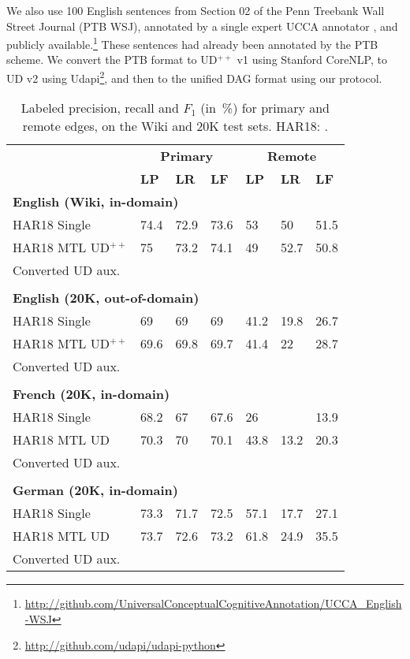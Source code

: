 \documentclass[11pt,a4paper]{article}
\begin{document}
We also use 100 English sentences from Section 02 of the Penn Treebank Wall Street Journal
(PTB WSJ),
annotated by a single expert UCCA annotator \cite{hershcovich2018multitask},
and publicly available.\footnote{\url{http://github.com/UniversalConceptualCognitiveAnnotation/UCCA_English-WSJ}}
These sentences had already been annotated by the PTB scheme.
We convert the PTB format to UD$^{++}$ v1 using Stanford CoreNLP,
to UD v2 using Udapi\footnote{\url{http://github.com/udapi/udapi-python}},
and then to the unified DAG format using our protocol.


\begin{table}[t]
\centering
\small
\setlength\tabcolsep{3pt}
\begin{tabular}{l|lll|lll}
& \multicolumn{3}{c|}{\footnotesize \bf Primary} & \multicolumn{3}{c}{\footnotesize \bf Remote} \\
& \footnotesize \textbf{LP} & \footnotesize \textbf{LR} & \footnotesize \textbf{LF}
& \footnotesize \textbf{LP} & \footnotesize \textbf{LR} & \footnotesize \textbf{LF} \\
\hline
\multicolumn{4}{l|}{\small \bf English (Wiki, in-domain)} & \\
\footnotesize HAR18 Single
& 74.4 & 72.9 & 73.6 & 53 & 50 & 51.5 \\
\footnotesize HAR18 MTL UD$^{++}$
& 75 & 73.2 & 74.1 & 49 & 52.7 & 50.8 \\
\footnotesize Converted UD aux.
\\
\hline\\
\multicolumn{4}{l|}{\small \bf English (20K, out-of-domain)} & \\
\footnotesize HAR18 Single
& 69 & 69 & 69 & 41.2 & 19.8 & 26.7 \\
\footnotesize HAR18 MTL UD$^{++}$
& 69.6 & 69.8 & 69.7 & 41.4 & 22 & 28.7 \\
\footnotesize Converted UD aux.
\\
\hline\\
\multicolumn{4}{l|}{\small \bf French (20K, in-domain)} & \\
\small HAR18 Single & 68.2 & 67 & 67.6 & 26 & \enskip 9.4 & 13.9 \\
\small HAR18 MTL UD & 70.3 & 70 & 70.1 & 43.8 & 13.2 & 20.3 \\
\footnotesize Converted UD aux.
\\
\hline\\
\multicolumn{4}{l|}{\small \bf German (20K, in-domain)} & \\
\small HAR18 Single & 73.3 & 71.7 & 72.5 & 57.1 & 17.7 & 27.1 \\
\small HAR18 MTL UD & 73.7 & 72.6 & 73.2 & 61.8 & 24.9 & 35.5 \\
\footnotesize Converted UD aux.
\\
\end{tabular}
\caption{
Labeled precision, recall and $F_1$ (in~\%) for primary and remote edges,
on the Wiki and 20K test sets.
HAR18: \protect{}.}\label{tab:aux_results}
\end{table}
\end{document}
